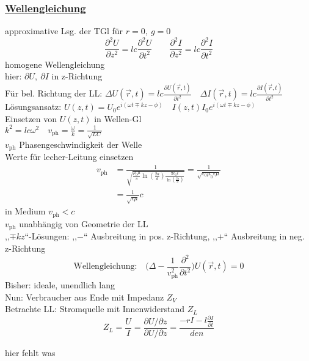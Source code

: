 \documentclass[titlepage,12pt,a4paper,ngerman]{report}
\newcommand{\tx}[1]{\textrm{#1}}
\begin{document}
\subsubsection{\underline{Wellengleichung}}
approximative Lsg. der TGl für $ r=0 , \ g=0 $
\begin{equation*}
\boxed{\frac{\partial ^2 U}{\partial z^2} = lc \frac{\partial ^2 U}{\partial t^2} \qquad \frac{\partial ^2 I}{\partial z^2} = lc \frac{\partial ^2 I}{\partial t^2}}
\end{equation*}
homogene Wellengleichung \\
hier:  $ \partial U, \ \partial I $ in z-Richtung\\
Für bel. Richtung der LL: $ \Delta U(\vec{r},t) = lc \frac{\partial U ( \vec{r},t)}{\partial t^2} \quad \Delta I(\vec{r},t) = lc \frac{\partial I (\vec{r},t)}{\partial t^2}$\\[5pt]
Lösungsansatz: $ U(z,t) = U_0 e^{i(\omega t \mp kz - \phi)} \quad I(z,t) I_0 e^{i (\omega t \mp kz - \phi)} $\\[5pt]
Einsetzen von $ U(z,t) $ in Wellen-Gl\\
$ k^2 = lc \omega ^2  \quad v_{\tx{ph}} = \frac{\omega}{k} = \frac{1}{\sqrt{LC}}$\\
$ v_{\tx{ph}} $ Phasengeschwindigkeit der Welle\\
Werte für lecher-Leitung einsetzen
\begin{align*}
v_{\tx{ph}} &= \frac{1}{\sqrt{\frac{\mu_0 \mu}{\pi} \ln(\frac{2a}{d}) \frac{\pi \epsilon_0 \epsilon}{\ln( \frac{2a}{d})}}} = \frac{1}{\sqrt{\epsilon_0 \mu_0 \epsilon \mu}} \\
&= \frac{1}{\sqrt{\epsilon \mu}} c
\end{align*}
in Medium $ v_{\tx{ph}} < c $\\
$ v_{\tx{ph}} $ unabhängig von Geometrie der LL\\
,,$ \mp kz $``-Lösungen: ,,$ - $`` Ausbreitung in pos. z-Richtung, ,,$ + $`` Ausbreitung in neg. z-Richtung\\
$$\tx{Wellengleichung:} \quad \bigg( \Delta - \frac{1}{v_{\tx{ph}}^2} \frac{\partial ^2}{\partial t^2} \bigg) U(\vec{r},t) = 0$$
Bisher: ideale, unendlich lang \\
Nun: Verbraucher aus Ende mit Impedanz $ Z_V $\\
Betrachte LL: Stromquelle mit Innenwiderstand $ Z_L $
$$Z_L = \frac{U}{I} = \frac{\partial U/ \partial z}{\partial U/ \partial z} = \frac{-r I - l \frac{\partial I}{\partial t}}{den}$$

hier fehlt was 
\end{document}
